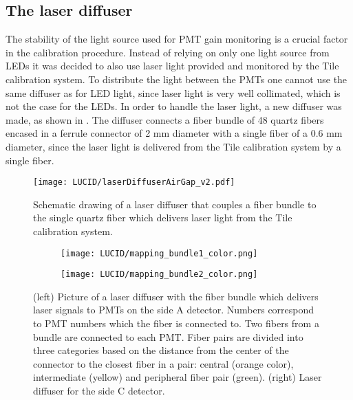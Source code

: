 
\subsection{The laser diffuser}
\label{subsec:laserDiffuser}

The stability of the light source used for PMT gain monitoring is a crucial factor in the calibration procedure.
Instead of relying on only one light source from LEDs it was decided to also use laser light
provided and monitored by the Tile calibration system. 
To distribute the light between the PMTs one cannot use the same diffuser as for LED light, 
since laser light is very well collimated, which is not the case for the LEDs.
In order to handle the laser light, a new diffuser was made, as shown in .
The diffuser connects a fiber bundle of 48 quartz fibers encased in a ferrule connector of 2 mm diameter with a single fiber of a 0.6 mm diameter,
since the laser light is delivered from the Tile calibration system by a single fiber.

\begin{figure}
\centering
\texttt{[image: LUCID/laserDiffuserAirGap\_v2.pdf]}
\caption{Schematic drawing of a laser diffuser that couples a fiber bundle to the single quartz fiber which delivers laser light from the Tile calibration system.}
\label{fig:laserDiffuserSchematics}
\end{figure}

\begin{figure}
\centering
\begin{subfigure}{.45\textwidth}
  \centering
  \texttt{[image: LUCID/mapping\_bundle1\_color.png]}
\end{subfigure}%
\begin{subfigure}{.45\textwidth}
  \centering
  \texttt{[image: LUCID/mapping\_bundle2\_color.png]}
\end{subfigure}
\caption{(left) Picture of a laser diffuser with the fiber bundle which delivers laser signals to PMTs on the side A detector. 
Numbers correspond to PMT numbers which the fiber is connected to. 
Two fibers from a bundle are connected to each PMT. 
Fiber pairs are divided into three categories based on the distance from the center of the connector to the closest fiber 
in a pair: central (orange color), intermediate (yellow) and peripheral fiber pair (green).
(right) Laser diffuser for the side C detector.}
\label{fig:laserDiffuserMapping}
\end{figure}

